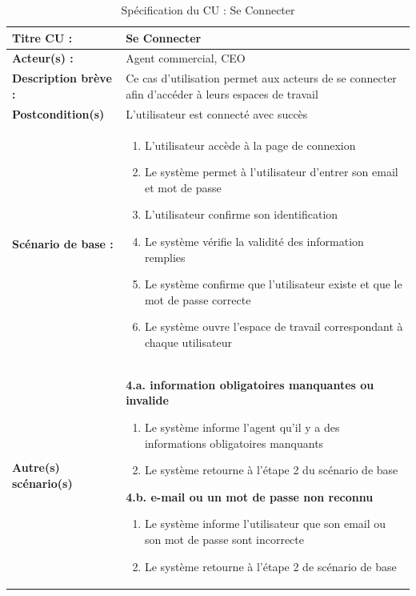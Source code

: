 \begin{table}[H]
\begin{tabularx}{\textwidth}{|l|X|}
\hline
\textbf{Titre CU :} & Se Connecter \\
\hline
\textbf{Acteur(s) :} & Agent commercial, CEO \\
\hline
\textbf{Description brève :} & Ce cas d'utilisation permet aux acteurs de se connecter afin d'accéder à leurs espaces de travail \\
\hline
\textbf{Postcondition(s)} & L'utilisateur est connecté avec succès \\
\hline
\textbf{Scénario de base :} &
\begin{enumerate}[leftmargin=1.5em, topsep=2pt, itemsep=1pt]
  \item L'utilisateur accède à la page de connexion
  \item Le système permet à l'utilisateur d'entrer son email et mot de passe
  \item L'utilisateur confirme son identification
  \item Le système vérifie la validité des information remplies
  \item Le système confirme que l'utilisateur existe et que le mot de passe correcte
  \item Le système ouvre l'espace de travail correspondant à chaque utilisateur
\end{enumerate} \\
\hline
\textbf{Autre(s) scénario(s)} &
\textbf{4.a. information obligatoires manquantes ou invalide}
\begin{enumerate}[leftmargin=1.5em, topsep=2pt, itemsep=1pt]
  \item Le système informe l'agent qu'il y a des informations obligatoires manquants
  \item Le système retourne à l'étape 2 du scénario de base
\end{enumerate}
\textbf{4.b. e-mail ou un mot de passe non reconnu}
\begin{enumerate}[leftmargin=1.5em, topsep=2pt, itemsep=1pt]
  \item Le système informe l'utilisateur que son email ou son mot de passe sont incorrecte
  \item Le système retourne à l'étape 2 de scénario de base
\end{enumerate} \\
\hline
\end{tabularx}
\caption{Spécification du CU : Se Connecter}
\label{tab:cu-connecter}
\end{table}

